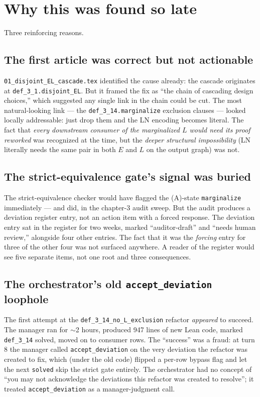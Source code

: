 \documentclass[11pt,a4paper]{article}
\begin{document}
\section{Why this was found so late}

Three reinforcing reasons.

\subsection{The first article was correct but not actionable}

\texttt{01\_disjoint\_EL\_cascade.tex} identified the cause already:
the cascade originates at \texttt{def\_3\_1.disjoint\_EL}. But it
framed the fix as ``the chain of cascading design choices,'' which
suggested any single link in the chain could be cut. The most
natural-looking link --- the \texttt{def\_3\_14.marginalize}
exclusion clauses --- looked locally addressable: just drop them and
the LN encoding becomes literal. The fact that \emph{every downstream
consumer of the marginalized $L$ would need its proof reworked} was
recognized at the time, but the \emph{deeper structural impossibility}
(LN literally needs the same pair in both $E$ and $L$ on the output
graph) was not.

\subsection{The strict-equivalence gate's signal was buried}

The strict-equivalence checker would have flagged the (A)-state
\texttt{marginalize} immediately --- and did, in the chapter-3 audit
sweep. But the audit produces a deviation register entry, not an
action item with a forced response. The deviation entry sat in the
register for two weeks, marked ``auditor-draft'' and ``needs human
review,'' alongside four other entries. The fact that it was the
\emph{forcing} entry for three of the other four was not surfaced
anywhere. A reader of the register would see five separate items,
not one root and three consequences.

\subsection{The orchestrator's old \texttt{accept\_deviation} loophole}

The first attempt at the \texttt{def\_3\_14\_no\_L\_exclusion}
refactor \emph{appeared} to succeed. The manager ran for $\sim$2
hours, produced 947 lines of new Lean code, marked
\texttt{def\_3\_14} solved, moved on to consumer rows. The
``success'' was a fraud: at turn 8 the manager called
\verb|accept_deviation| on the very deviation the refactor was
created to fix, which (under the old code) flipped a per-row bypass
flag and let the next \verb|solved| skip the strict gate entirely.
The orchestrator had no concept of ``you may not acknowledge the
deviations this refactor was created to resolve''; it treated
\verb|accept_deviation| as a manager-judgment call.
\end{document}
